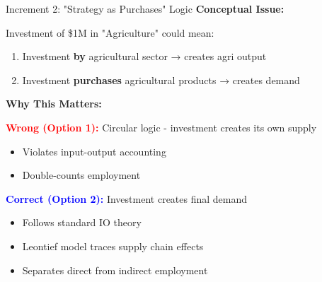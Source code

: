 \documentclass[10pt]{beamer}
\begin{document}
\begin{frame}[fragile]{Increment 2: "Strategy as Purchases" Logic}
\textbf{Conceptual Issue:}

Investment of \$1M in "Agriculture" could mean:
\begin{enumerate}
    \item Investment \textbf{by} agricultural sector → creates agri output
    \item Investment \textbf{purchases} agricultural products → creates demand
\end{enumerate}

\vspace{0.3cm}

\textbf{Why This Matters:}

\vspace{0.2cm}

\textcolor{red}{\textbf{Wrong (Option 1):}} Circular logic - investment creates its own supply
\begin{itemize}
    \item Violates input-output accounting
    \item Double-counts employment
\end{itemize}

\vspace{0.2cm}

\textcolor{blue}{\textbf{Correct (Option 2):}} Investment creates final demand
\begin{itemize}
    \item Follows standard IO theory
    \item Leontief model traces supply chain effects
    \item Separates direct from indirect employment
\end{itemize}

\end{frame}
\end{document}
